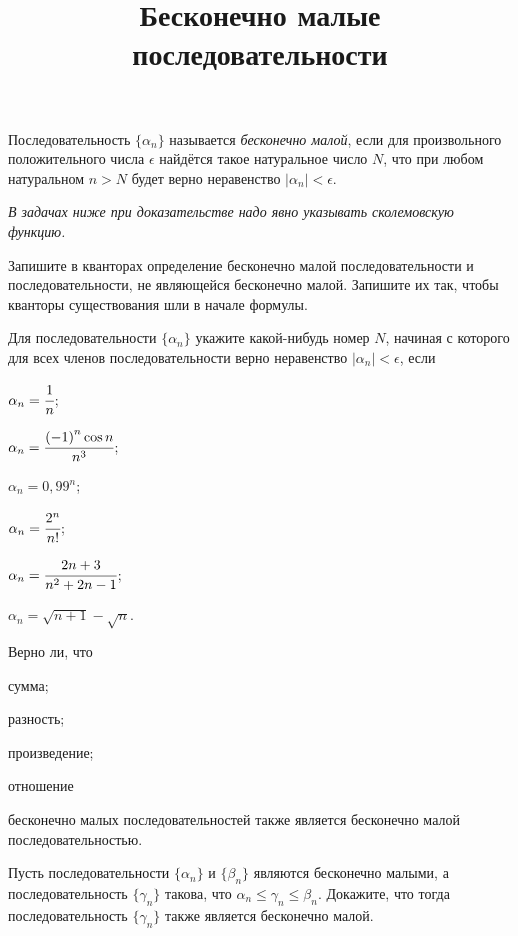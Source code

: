 \documentclass[a4paper, 12pt, num=26]{listok}
\begin{document}
\title{Бесконечно малые последовательности}
\maketitle{}
\begin{definition}
	Последовательность $\{\alpha_n\}$ называется \textit{бесконечно малой}, если для произвольного положительного числа $\epsilon$
	найдётся такое натуральное число $N$, что при любом натуральном $n > N$ будет верно неравенство $|\alpha_n| < \epsilon$.
\end{definition}
\begin{center}
	\textit{В задачах ниже при доказательстве надо явно указывать сколемовскую функцию.}
\end{center}
\begin{problem}
	Запишите в кванторах определение бесконечно малой последовательности и последовательности, не являющейся бесконечно малой.
	Запишите их так, чтобы кванторы существования шли в начале формулы.
\end{problem}
\begin{problem}
	Для последовательности $\{\alpha_n\}$ укажите какой-нибудь номер $N$, начиная с которого для всех членов последовательности верно неравенство
	$|\alpha_n| < \epsilon$, если
	\begin{multienum}{3}
		\item $\alpha_n = \cfrac1n$;
		\item $\alpha_n = \cfrac{{(-1)}^n \cos n}{n^3}$;
		\item $\alpha_n = {0{,}99}^n$;
		\item $\alpha_n = \cfrac{2^n}{n!}$;
		\item $\alpha_n = \cfrac{2n+3}{n^2+2n-1}$;
		\item $\alpha_n = \sqrt{n + 1} - \sqrt n$.
	\end{multienum}
\end{problem}
\begin{problem}
	Верно ли, что
	\begin{probparts}
		\item сумма;
		\item разность;
		\item произведение;
		\item отношение
	\end{probparts}
	бесконечно малых последовательностей также является бесконечно малой последовательностью.
\end{problem}
\begin{problem}
	Пусть последовательности $\{\alpha_n\}$ и $\{\beta_n\}$ являются бесконечно малыми,
	а последовательность $\{\gamma_n\}$ такова, что $\alpha_n \le \gamma_n \le \beta_n$.
	Докажите, что тогда последовательность $\{\gamma_n\}$ также является бесконечно малой.
\end{problem}
\end{document}
